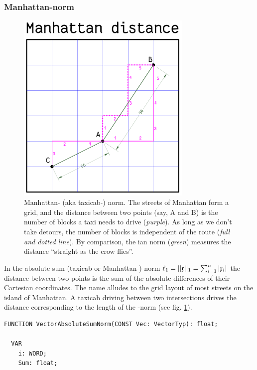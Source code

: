 \begin{refsection}
\subsubsection{Manhattan-norm}

\begin{figure}
 \caption{Manhattan- (aka taxicab-) norm. The streets of Manhattan form a grid, and the distance between two points (say, A and B) is the number of blocks a taxi needs to drive (\emph{purple}). As long as we don't take detours, the number of blocks is independent of the route (\emph{full and dotted line}). By comparison, the ian norm (\emph{green}) measures the distance ``straight as the crow flies''. }
 \label{fig:Manh}
 \centering
 \includegraphics[width=0.75\textwidth]{Graphics/Manhattan}
\end{figure}

In the absolute sum (taxicab or Manhattan-) norm \(\ell_1 = ||\mathfrak{x}||_1 = \sum_{i=1}^n{|\mathfrak{x}_i|} \) the distance between two points is the sum of the absolute differences of their Cartesian coordinates. The name alludes to the grid layout of most streets on the island of Manhattan. A taxicab driving between two intersections drives the distance corresponding to the length of the -norm (see fig. \ref{fig:Manh}).

\begin{lstlisting}[caption=Absolute sum norm]
  FUNCTION VectorAbsoluteSumNorm(CONST Vec: VectorTyp): float;

  VAR
    i: WORD;
    Sum: float;


\end{lstlisting}
\end{refsection}
